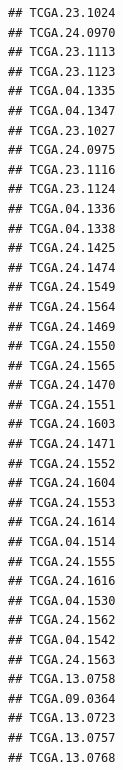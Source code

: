 \documentclass[UTF8]{beamer}\usepackage[]{graphicx}\usepackage[]{color}
\makeatletter
\newenvironment{kframe}{%
 \def\at@end@of@kframe{}%
 \ifinner\ifhmode%
  \def\at@end@of@kframe{\end{minipage}}%
  \begin{minipage}{\columnwidth}%
 \fi\fi%
 \def\FrameCommand##1{\hskip\@totalleftmargin \hskip-\fboxsep
 \colorbox{shadecolor}{##1}\hskip-\fboxsep
     \hskip-\linewidth \hskip-\@totalleftmargin \hskip\columnwidth}%
 \MakeFramed {\advance\hsize-\width
   \@totalleftmargin\z@ \linewidth\hsize
   \@setminipage}}%
 {\par\unskip\endMakeFramed%
 \at@end@of@kframe}
\newenvironment{knitrout}{}{} %
\makeatother
\begin{document}
\begin{frame}[fragile]
\begin{knitrout}
\begin{kframe}
\begin{verbatim}
## TCGA.23.1024                                                    
## TCGA.24.0970                                                    
## TCGA.23.1113                                                    
## TCGA.23.1123                                                    
## TCGA.04.1335                                                    
## TCGA.04.1347                                                    
## TCGA.23.1027                                                    
## TCGA.24.0975                                                    
## TCGA.23.1116                                                    
## TCGA.23.1124                                                    
## TCGA.04.1336                                                    
## TCGA.04.1338                                                    
## TCGA.24.1425                                                    
## TCGA.24.1474                                                    
## TCGA.24.1549                                                    
## TCGA.24.1564                                                    
## TCGA.24.1469                                                    
## TCGA.24.1550                                                    
## TCGA.24.1565                                                    
## TCGA.24.1470                                                    
## TCGA.24.1551                                                    
## TCGA.24.1603                                                    
## TCGA.24.1471                                                    
## TCGA.24.1552                                                    
## TCGA.24.1604                                                    
## TCGA.24.1553                                                    
## TCGA.24.1614                                                    
## TCGA.04.1514                                                    
## TCGA.24.1555                                                    
## TCGA.24.1616                                                    
## TCGA.04.1530                                                    
## TCGA.24.1562                                                    
## TCGA.04.1542                                                    
## TCGA.24.1563                                                    
## TCGA.13.0758                                                    
## TCGA.09.0364                                                    
## TCGA.13.0723                                                    
## TCGA.13.0757                                                    
## TCGA.13.0768                                                    

\end{verbatim}
\end{kframe}
\end{knitrout}
\end{frame}
\end{document}
